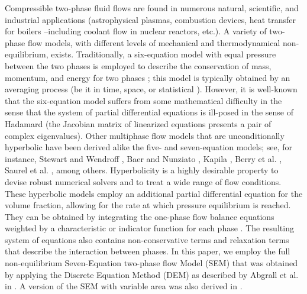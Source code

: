 \documentclass[preprint,10pt]{elsarticle}
\begin{document}
Compressible two-phase fluid flows are found in numerous natural, scientific, and industrial applications (astrophysical plasmas, 
combustion devices, heat transfer for boilers --including coolant flow in nuclear reactors, etc.). 
A variety of two-phase flow models, with different levels of mechanical and thermodynamical non-equilibrium, exists. 
Traditionally, a six-equation model with equal pressure between the two phases is employed to describe the conservation of mass, 
momentum, and energy for two phases \cite{Stadtke}; this model is typically obtained by an averaging process (be it in time, space,
or statistical \cite{BruceStewart1984363}). However, it is well-known that the six-equation model 
suffers from some mathematical difficulty in the sense that the system of partial differential equations is ill-posed in the sense of Hadamard 
(the Jacobian matrix of linearized equations presents a pair of complex eigenvalues). 
Other multiphase flow models that are unconditionally hyperbolic have been derived alike the five- and seven-equation models; see, for instance, Stewart and Wendroff \cite{BruceStewart1984363}, 
Baer and Nunziato \cite{BaerNunziato}, Kapila \cite{Kapila_2001,Berry_NED2010}, Berry et al. \cite{Berry_1985}, Saurel et al. \cite{Saurel_2001a,Saurel_2001b}, 
among others. Hyperbolicity is a highly desirable property to devise robust numerical solvers and to treat a wide range of flow conditions.
These hyperbolic models employ an additional partial differential equation for the volume fraction, allowing for the rate at 
which pressure equilibrium is reached.  They can be obtained by integrating the one-phase flow balance equations weighted by a characteristic 
or indicator function for each phase \cite{DrewPassman}. The resulting system of equations also contains non-conservative terms and relaxation terms that 
describe the interaction between phases. In this paper, we employ the full non-equilibrium Seven-Equation two-phase flow Model 
(SEM) that was obtained by applying the Discrete Equation Method (DEM) as described by Abgrall et al. in \cite{AbgrallandSaurel2003}. A version of the SEM with variable area was also derived in \cite{Berry_NED2010}.
\end{document}
